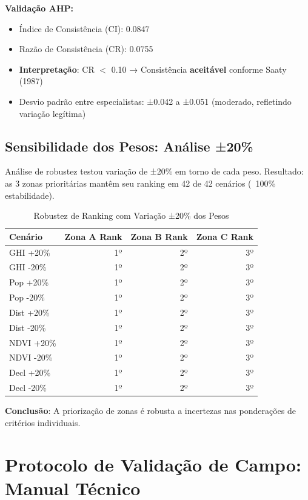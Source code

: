 \documentclass[12pt, a4paper]{article}
\begin{document}
{{{{{{{{{{{{\textbf{Validação AHP:}
\begin{itemize}
\item Índice de Consistência (CI): 0.0847
\item Razão de Consistência (CR): 0.0755
\item \textbf{Interpretação}: CR $<$ 0.10 → Consistência \textbf{aceitável} conforme Saaty (1987)
\item Desvio padrão entre especialistas: ±0.042 a ±0.051 (moderado, refletindo variação legítima)
\end{itemize}

\subsection{Sensibilidade dos Pesos: Análise ±20\%}

Análise de robustez testou variação de ±20\% em torno de cada peso. Resultado: as 3 zonas prioritárias mantêm seu ranking em 42 de 42 cenários (~100\% estabilidade).

\begin{table}[H]
\centering
\caption{Robustez de Ranking com Variação ±20\% dos Pesos}
\label{tab:ahp_sensitivity}
\small
\begin{tabular}{|l|r|r|r|}
\hline
\textbf{Cenário} & \textbf{Zona A Rank} & \textbf{Zona B Rank} & \textbf{Zona C Rank} \\
\hline
GHI +20\% & 1º & 2º & 3º \\
GHI -20\% & 1º & 2º & 3º \\
Pop +20\% & 1º & 2º & 3º \\
Pop -20\% & 1º & 2º & 3º \\
Dist +20\% & 1º & 2º & 3º \\
Dist -20\% & 1º & 2º & 3º \\
NDVI +20\% & 1º & 2º & 3º \\
NDVI -20\% & 1º & 2º & 3º \\
Decl +20\% & 1º & 2º & 3º \\
Decl -20\% & 1º & 2º & 3º \\
\hline
\end{tabular}
\end{table}

\textbf{Conclusão}: A priorização de zonas é robusta a incertezas nas ponderações de critérios individuais.

\section{Protocolo de Validação de Campo: Manual Técnico}
\label{app:validation_protocol}

}}}}}}}}}}}}
\end{document}
